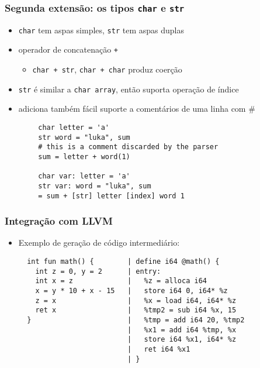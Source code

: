 \documentclass{beamer}
\begin{document}
\begin{frame}[fragile]
    \frametitle{Segunda extensão: os tipos \texttt{char} e \texttt{str}}

    \begin{itemize}
        \item \texttt{char} tem aspas simples, \texttt{str} tem aspas duplas
        \item operador de concatenação \texttt{+}
        \begin{itemize}
            \item \texttt{char + str}, \texttt{char + char} produz coerção 
        \end{itemize}
        \item \texttt{str} é similar a \texttt{char array},
            então suporta operação de índice
        \item adiciona também fácil suporte a comentários de uma linha com \#
    \end{itemize}

    \begin{verbatim}
        char letter = 'a'
        str word = "luka", sum
        # this is a comment discarded by the parser
        sum = letter + word(1)

        char var: letter = 'a'
        str var: word = "luka", sum
        = sum + [str] letter [index] word 1
    \end{verbatim}
\end{frame}

\begin{frame}[fragile]
    \frametitle{Integração com LLVM}

    \begin{itemize}
        \item Exemplo de geração de código intermediário:

        \begin{verbatim}
  int fun math() {        | define i64 @math() {
    int z = 0, y = 2      | entry:
    int x = z             |   %z = alloca i64
    x = y * 10 + x - 15   |   store i64 0, i64* %z
    z = x                 |   %x = load i64, i64* %z
    ret x                 |   %tmp2 = sub i64 %x, 15
  }                       |   %tmp = add i64 20, %tmp2
                          |   %x1 = add i64 %tmp, %x
                          |   store i64 %x1, i64* %z
                          |   ret i64 %x1
                          | }
        \end{verbatim}
    \end{itemize}
\end{frame}
\end{document}
